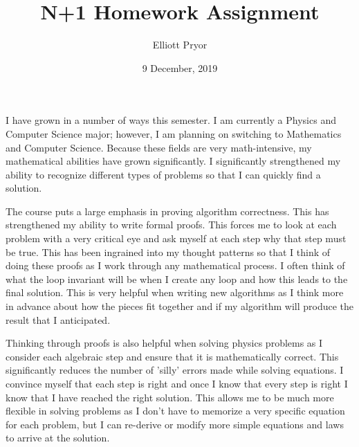 \documentclass{article}
\title{N+1 Homework Assignment}
\author{Elliott Pryor}
\date{9 December, 2019}
\begin{document}
\maketitle





I have grown in a number of ways this semester. I am currently a Physics and Computer Science major;
however, I am planning on switching to Mathematics and Computer Science. Because these fields are very math-intensive,
my mathematical abilities have grown significantly. I significantly strengthened my ability to recognize different types of problems so that I can quickly find a solution.

The course puts a large emphasis in proving algorithm correctness. This has strengthened my ability to write formal proofs.
This forces me to look at each problem with a very critical eye and ask myself at each step why that step must be true.
This has been ingrained into my thought patterns so that I think of doing these proofs as I work through any mathematical process.
I often think of what the loop invariant will be when I create any loop and how this leads to the final solution.
This is very helpful when writing new algorithms as I think more in advance about how the pieces fit together and if my algorithm will produce the result that I anticipated.


Thinking through proofs is also helpful when solving physics problems as I consider each algebraic step and ensure that it is mathematically correct.
This significantly reduces the number of 'silly' errors made while solving equations.
I convince myself that each step is right and once I know that every step is right I know that I have reached the right solution.
This allows me to be much more flexible in solving problems as I don't have to memorize a very specific equation for each problem,
but I can re-derive or modify more simple equations and laws to arrive at the solution.
\end{document}
